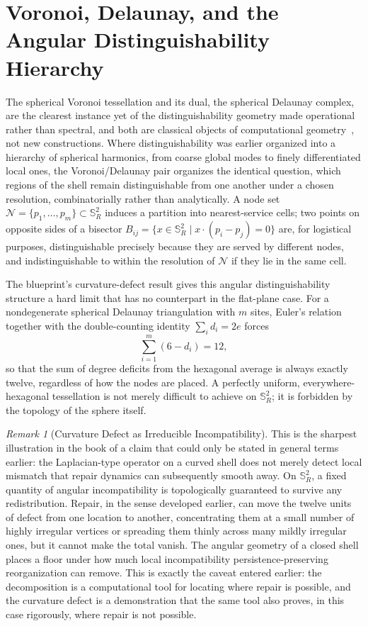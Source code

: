 \documentclass[11pt,fleqn]{book}
\numberwithin{equation}{chapter}
\theoremstyle{plain}
\theoremstyle{definition}
\theoremstyle{remark}
\newtheorem{remark}[theorem]{Remark}
\newcommand{\Sphere}{\mathbb{S}^{2}}
\newcommand{\Nset}{\mathcal{N}}
\begin{document}
\section{Voronoi, Delaunay, and the Angular Distinguishability Hierarchy}

The spherical Voronoi tessellation and its dual, the spherical Delaunay complex, are the clearest instance yet of the distinguishability geometry made operational rather than spectral, and both are classical objects of computational geometry~\cite{okabe2000}, not new constructions. Where distinguishability was earlier organized into a hierarchy of spherical harmonics, from coarse global modes to finely differentiated local ones, the Voronoi/Delaunay pair organizes the identical question, which regions of the shell remain distinguishable from one another under a chosen resolution, combinatorially rather than analytically. A node set \(\Nset=\{p_1,\dots,p_m\}\subset\Sphere_R\) induces a partition into nearest-service cells; two points on opposite sides of a bisector \(B_{ij}=\{x\in\Sphere_R\mid x\cdot(p_i-p_j)=0\}\) are, for logistical purposes, distinguishable precisely because they are served by different nodes, and indistinguishable to within the resolution of \(\Nset\) if they lie in the same cell.

The blueprint's curvature-defect result gives this angular distinguishability structure a hard limit that has no counterpart in the flat-plane case. For a nondegenerate spherical Delaunay triangulation with \(m\) sites, Euler's relation together with the double-counting identity \(\sum_i d_i = 2e\) forces
\begin{equation}
\sum_{i=1}^m (6-d_i) = 12,
\end{equation}
so that the sum of degree deficits from the hexagonal average is always exactly twelve, regardless of how the nodes are placed. A perfectly uniform, everywhere-hexagonal tessellation is not merely difficult to achieve on \(\Sphere_R\); it is forbidden by the topology of the sphere itself.

\begin{remark}[Curvature Defect as Irreducible Incompatibility]
This is the sharpest illustration in the book of a claim that could only be stated in general terms earlier: the Laplacian-type operator on a curved shell does not merely detect local mismatch that repair dynamics can subsequently smooth away. On \(\Sphere_R\), a fixed quantity of angular incompatibility is topologically guaranteed to survive any redistribution. Repair, in the sense developed earlier, can move the twelve units of defect from one location to another, concentrating them at a small number of highly irregular vertices or spreading them thinly across many mildly irregular ones, but it cannot make the total vanish. The angular geometry of a closed shell places a floor under how much local incompatibility persistence-preserving reorganization can remove. This is exactly the caveat entered earlier: the decomposition is a computational tool for locating where repair is possible, and the curvature defect is a demonstration that the same tool also proves, in this case rigorously, where repair is not possible.
\end{remark}
\end{document}
